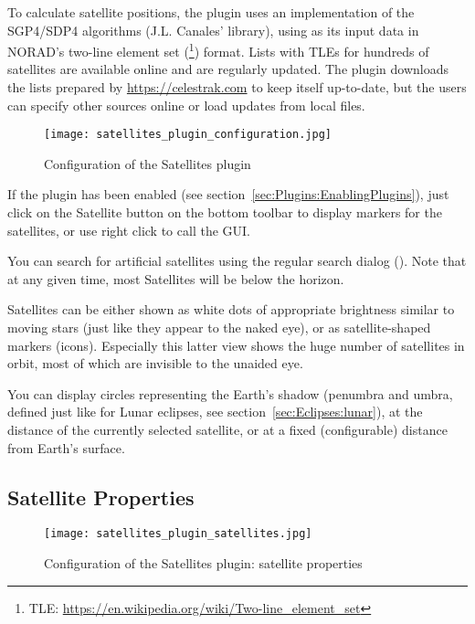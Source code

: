To calculate satellite positions, the plugin uses an implementation of
the SGP4/SDP4 algorithms (J.L. Canales'  library), using
as its input data in NORAD's two-line element set
(\footnote{TLE: \url{https://en.wikipedia.org/wiki/Two-line_element_set}})
format. Lists with TLEs for hundreds of satellites are available
online and are regularly updated. The plugin downloads the lists
prepared by \url{https://celestrak.com} to keep itself up-to-date, but the users can
specify other sources online or load updates from local files.

\begin{figure}[htbp]
	\centering\texttt{[image: satellites\_plugin\_configuration.jpg]}
	\caption{Configuration of the Satellites plugin}
	\label{fig:plugins:Satellites:Configuration}
\end{figure}

If the plugin has been enabled (see
section~\ref{sec:Plugins:EnablingPlugins}), just click on the
Satellite button   on the bottom
toolbar to display markers for the satellites, or use right click to call the GUI.

You can search for artificial satellites using
the regular search dialog (). Note that at any given time, most
Satellites will be below the horizon.

Satellites can be either shown as white dots of appropriate brightness
similar to moving stars (just like they appear to the naked eye), or
as satellite-shaped markers (icons). Especially this latter view shows
the huge number of satellites in orbit, most of which are invisible to
the unaided eye.

You can display  circles representing the Earth's
shadow (penumbra and umbra, defined just like for Lunar eclipses, see
section~\ref{sec:Eclipses:lunar}), at the distance of the currently
selected satellite, or at a fixed (configurable) distance from Earth's surface.

\subsection{Satellite Properties}
\label{sec:plugins:Satellites:properties}

\begin{figure}[tbp]
	\centering\texttt{[image: satellites\_plugin\_satellites.jpg]}
	\caption{Configuration of the Satellites plugin: satellite properties}
	\label{fig:plugins:Satellites:Configuration:Satellites}
\end{figure}

